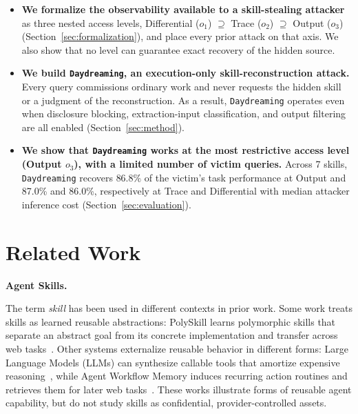 \documentclass[letterpaper,twocolumn,10pt]{article}
\newcommand{\method}{\texttt{Daydreaming}\xspace}
\newcommand{\paragraphtitle}[1]{%
  \vspace{5pt}\noindent\textbf{#1.}%
}
\begin{document}
\begin{itemize}
  \item \textbf{We formalize the observability available to a skill-stealing attacker}
  as three nested access levels, Differential ($o_1$) $\supseteq$ Trace ($o_2$) $\supseteq$
  Output ($o_3$) (Section~\ref{sec:formalization}), 
  and place every prior attack on that axis.  We also show that no level can guarantee exact recovery of the
  hidden source.

  \item \textbf{We build \method, an execution-only skill-reconstruction attack.}
  Every query commissions ordinary work and never requests the hidden skill or a
  judgment of the reconstruction.
  As a result, \method operates even when disclosure blocking, extraction-input classification, and output filtering are all enabled (Section~\ref{sec:method}).

  \item \textbf{We show that \method works at the most restrictive access level (Output $o_3$), with a limited number of victim queries.}
  Across 7 skills, \method recovers $86.8\%$ of the victim's task performance at Output and 87.0\% and 86.0\%, respectively at Trace and Differential with median attacker inference cost (Section~\ref{sec:evaluation}).

\end{itemize}

\section{Related Work}

\paragraphtitle{Agent Skills}
\label{sec:agent-skills} 
The term \emph{skill} has been used in different contexts in prior work. 
Some work treats skills as learned reusable abstractions: PolySkill learns polymorphic skills that separate an abstract goal from its concrete implementation and transfer across web tasks~\cite{yu2026polyskill}. Other systems externalize reusable behavior in different forms: Large Language Models (LLMs) can synthesize callable tools that amortize expensive reasoning~\cite{cai2024toolmakers}, while Agent Workflow Memory induces recurring action routines and retrieves them for later web tasks~\cite{wang2025awm}. 
These works illustrate forms of reusable agent capability, but do not study skills as confidential, provider-controlled assets.
\end{document}
